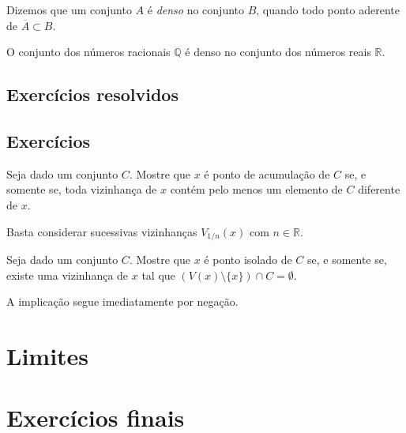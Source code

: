 \begin{defn}
  Dizemos que um conjunto $A$ é \emph{denso} no conjunto $B$, quando todo ponto aderente de $\overline{A} \subset B$. 
\end{defn}

\begin{ex}
  O conjunto dos números racionais $\mathbb{Q}$ é denso no conjunto dos números reais $\mathbb{R}$.
\end{ex}

\subsection{Exercícios resolvidos}

\construirExeresol

\subsection{Exercícios}

\construirExer

\begin{exer}
  Seja dado um conjunto $C$. Mostre que $x$ é ponto de acumulação de $C$ se, e somente se, toda vizinhança de $x$ contém pelo menos um elemento de $C$ diferente de $x$.
\end{exer}
\begin{sol}
  Basta considerar sucessivas vizinhanças $V_{1/n}(x)$ com $n\in\mathbb{R}$.
\end{sol}

\begin{exer}
  Seja dado um conjunto $C$. Mostre que $x$ é ponto isolado de $C$ se, e somente se, existe uma vizinhança de $x$ tal que $(V(x)\setminus\{x\})\cap C = \emptyset$.
\end{exer}
\begin{sol}
  A implicação segue imediatamente por negação.
\end{sol}


\section{Limites}

\construirExer

\section{Exercícios finais}

\construirExer